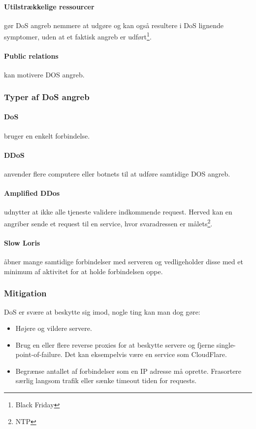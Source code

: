\paragraph{Utilstrækkelige ressourcer} gør DoS angreb nemmere at udgøre og kan også resultere i DoS lignende symptomer, uden at et faktisk angreb er udført\footnote{Black Friday}.

\paragraph{Public relations} kan motivere DOS angreb.

\subsubsection{Typer af DoS angreb}

\paragraph{DoS} bruger en enkelt forbindelse.

\paragraph{DDoS} anvender flere computere eller botnets til at udføre samtidige DOS angreb.

\paragraph{Amplified DDos} udnytter at ikke alle tjeneste validere indkommende request. Herved kan en angriber sende et request til en service, hvor svaradressen er målets\footnote{NTP}.

\paragraph{Slow Loris} åbner mange samtidige forbindelser med serveren og vedligeholder disse med et minimum af aktivitet for at holde forbindelsen oppe.

\subsubsection{Mitigation}
DoS er svære at beskytte sig imod, nogle ting kan man dog gøre:

\begin{itemize}
	\item Højere og vildere servere.
	\item Brug en eller flere reverse proxies for at beskytte servere og fjerne single-point-of-failure. Det kan eksempelvis være en service som CloudFlare.
	\item Begrænse antallet af forbindelser som en IP adresse må oprette. Frasortere særlig langsom trafik eller sænke timeout tiden for requests.
\end{itemize}

